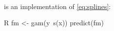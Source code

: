 \begin{defncbox}
    \begin{defnc}\label{defnc:smoothing_splines}
    is an implementation of \cref{eq:splines}:
    \begin{mintlinebox}{R}
        fm <- gam(y~s(x))
        predict(fm)
    \end{mintlinebox}
    \end{defnc}
\end{defncbox}
